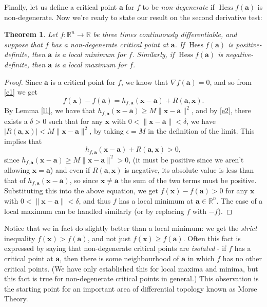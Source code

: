 \documentclass[12pt,letterpaper]{article}
\newtheorem{theorem}{Theorem}[section]
\newcommand{\R}{\mathbb{R}}
\newcommand{\x}{\mathbf{x}}
\renewcommand{\a}{\mathbf{a}}
\DeclareMathOperator{\Hess}{Hess}
\begin{document}
Finally, let us define a critical point $\a$ for $f$ to be {\em non-degenerate} if $\Hess f(\a)$ is non-degenerate.  Now we're ready to state our result on the second derivative test:
\begin{theorem}
Let $f:\R^n\to\R$ be three times continuously differentiable, and suppose that $f$ has a non-degenerate critical point at $\a$. If $\Hess f(\a)$ is positive-definite, then $\a$ is a local minimum for $f$. Similarly, if $\Hess f(\a)$ is negative-definite, then $\a$ is a local maximum for $f$.
\end{theorem}
\begin{proof}
Since $\a$ is a critical point for $f$, we know that $\nabla f(\a)=0$, and so from \eqref{e1} we get
\[
f(\x)-f(\a) = h_{f,\a}(\x-\a)+R(\a,\x).
\]
By Lemma \ref{l1}, we have that $h_{f,\a}(\x-\a)\geq M\lVert\x-\a\rVert^2$, and by \eqref{e2}, there exists a $\delta>0$ such that for any $\x$ with $0<\lVert \x-\a\rVert<\delta$, we have $|R(\a,\x)|<M\lVert \x-\a\rVert^2$, by taking $\epsilon=M$ in the definition of the limit. This implies that
\[
h_{f,\a}(\x-\a)+R(\a,\x)>0,
\]
since $h_{f,\a}(\x-\a)\geq M\lVert \x-\a\rVert^2> 0$, (it must be positive since we aren't allowing $\x=\a$) and even if $R(\a,\x)$ is negative, its absolute value is less than that of $h_{f,\a}(\x-\a)$, so since $\x\neq\a$ the sum of the two terms must be positive.
Substituting this into the above equation, we get $f(\x)-f(\a)>0$ for any $\x$ with $0<\lVert\x-\a\rVert<\delta$, and thus $f$ has a local minimum at $\a\in\R^n$. The case of a local maximum can be handled similarly (or by replacing $f$ with $-f$).
\end{proof}
Notice that we in fact do slightly better than a local minimum: we get the {\em strict} inequality $f(\x)>f(\a)$, and not just $f(\x)\geq f(\a)$. Often this fact is expressed by saying that non-degenerate critical points are {\em isolated} - if $f$ has a critical point at $\a$, then there is some neighbourhood of $\a$ in which $f$ has no other critical points. (We have only established this for local maxima and minima, but this fact is true for non-degenerate critical points in general.) This observation is the starting point for an important area of differential topology known as Morse Theory.
\end{document}

